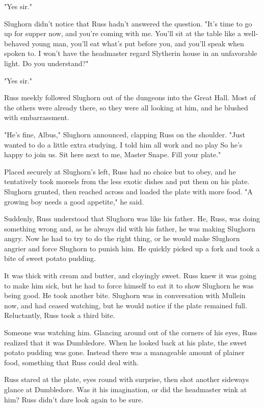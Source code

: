 "Yes{\el} sir."

Slughorn didn't notice that Russ hadn't answered the question. "It's time to go up for supper now, and you're coming with me. You'll sit at the table like a well-behaved young man, you'll eat what's put before you, and you'll speak when spoken to. I won't have the headmaster regard Slytherin house in an unfavorable light. Do you understand?"

"Yes{\el} sir."

Russ meekly followed Slughorn out of the dungeons into the Great Hall. Most of the others were already there, so they were all looking at him, and he blushed with embarrassment.

"He's fine, Albus," Slughorn announced, clapping Russ on the shoulder. "Just wanted to do a little extra studying. I told him all work and no play{\el} So he's happy to join us. Sit here next to me, Master Snape. Fill your plate."

Placed securely at Slughorn's left, Russ had no choice but to obey, and he tentatively took morsels from the less exotic dishes and put them on his plate. Slughorn grunted, then reached across and loaded the plate with more food. "A growing boy needs a good appetite," he said.

Suddenly, Russ understood that Slughorn was like his father. He, Russ, was doing something wrong and, as he always did with his father, he was making Slughorn angry. Now he had to try to do the right thing, or he would make Slughorn angrier and force Slughorn to punish him. He quickly picked up a fork and took a bite of sweet potato pudding.

It was thick with cream and butter, and cloyingly sweet. Russ knew it was going to make him sick, but he had to force himself to eat it to show Slughorn he was being good. He took another bite. Slughorn was in conversation with Mullein now, and had ceased watching, but he would notice if the plate remained full. Reluctantly, Russ took a third bite.

Someone was watching him. Glancing around out of the corners of his eyes, Russ realized that it was Dumbledore. When he looked back at his plate, the sweet potato pudding was gone. Instead there was a manageable amount of plainer food, something that Russ could deal with.

Russ stared at the plate, eyes round with surprise, then shot another sideways glance at Dumbledore. Was it his imagination, or did the headmaster wink at him? Russ didn't dare look again to be sure.

